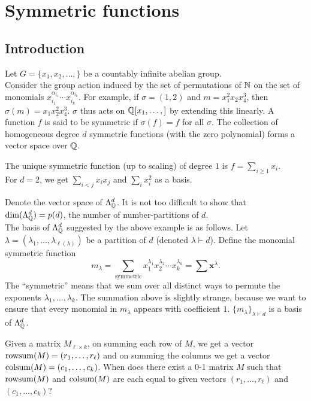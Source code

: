 
\section{Symmetric functions}

\subsection{Introduction}

	Let $G = \{x_1,x_2,\ldots,\}$ be a countably infinite abelian group.\\ 
	Consider the group action induced by the set of permutations of $\mathbb{N}$ on the set of monomials $x_{i_1}^{\alpha_{i_1}}\cdots x_{i_k}^{\alpha_{i_k}}$. For example,
	if $\sigma = (1,2)$ and $m = x_1^2x_2x_4^3$, then $\sigma(m) = x_1x_2^2x_4^3$.
	$\sigma$ thus acts on $\mathbb{Q}[x_1,\ldots,]$ by extending this linearly. A function $f$ is said to be symmetric if $\sigma(f) = f$ for all $\sigma$. The collection of homogeneous degree $d$ symmetric functions (with the zero polynomial) forms a vector space over $\mathbb{Q}$.

	\begin{fex}
		The unique symmetric function (up to scaling) of degree $1$ is $f = \sum_{i \ge 1} x_i$.\\
		For $d=2$, we get $\sum_{i<j} x_ix_j$ and $\sum_i x_i^2$ as a basis.
	\end{fex}

	Denote the vector space of $\Lambda_{\mathbb{Q}}^d$. It is not too difficult to show that $\dim(\Lambda_{\mathbb{Q}}^d) = p(d)$, the number of number-partitions of $d$.\\
	The basis of $\Lambda_{\mathbb{Q}}^d$ suggested by the above example is as follows. Let $\lambda = (\lambda_1,\ldots,\lambda_{\ell(\lambda)})$ be a partition of $d$ (denoted $\lambda \vdash d$). Define the monomial symmetric function
	\[ m_\lambda = \sum_{\text{symmetric}} x_1^{\lambda_1} x_2^{\lambda_2} \cdots x_k^{\lambda_k} = \sum \textbf{x}^\lambda. \]
	The ``symmetric'' means that we sum over all distinct ways to permute the exponents $\lambda_1,\ldots,\lambda_k$. The summation above is slightly strange, because we want to ensure that every monomial in $m_\lambda$ appears with coefficient $1$. $\{m_\lambda\}_{\lambda \vdash d}$ is a basis of $\Lambda_{\mathbb{Q}}^d$.

	\begin{question}
		\label{question: rowsum colsum}
		Given a matrix $M_{\ell \times k}$, on summing each row of $M$, we get a vector $\operatorname{rowsum}(M) = (r_1,\ldots,r_\ell)$ and on summing the columns we get a vector $\operatorname{colsum}(M) = (c_1,\ldots,c_k)$. When does there exist a 0-1 matrix $M$ such that $\operatorname{rowsum}(M)$ and $\operatorname{colsum}(M)$ are each equal to given vectors $(r_1,\ldots,r_\ell)$ and $(c_1,\ldots,c_k)$?
	\end{question}


